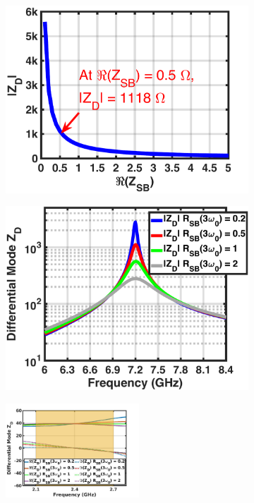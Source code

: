 \documentclass[conference]{IEEEtran}
\begin{document}
\begin{figure}[!t]
\captionsetup{font=footnotesize}
\centering
\begin{subfigure}{0.24\textwidth}
\includegraphics[width=1\textwidth]{Images/Design/Design_A_Zn_3H.pdf}
\caption{}
\label{fig:Design_A_Zn_3H}
\end{subfigure}
\begin{subfigure}{0.24\textwidth}
\includegraphics[width=1\textwidth]{Images/Design/Design_A_Rn_var_3H.pdf}
\caption{}
\label{fig:Design_A_Rn_var_3H}
\end{subfigure}
\begin{subfigure}{0.5\textwidth}
\centering
\includegraphics[width=0.55\textwidth]{Images/Design/Design_A_Rn_var_1H.pdf}

\end{subfigure}
\end{figure}
\end{document}
